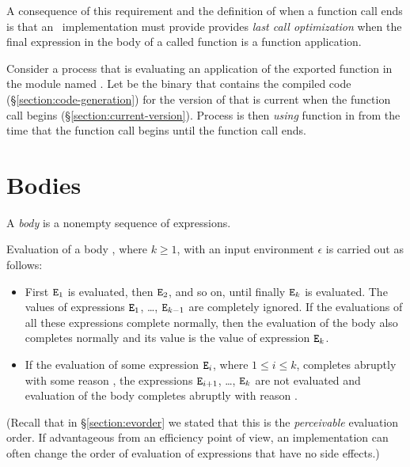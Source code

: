 \label{section:lco}

A consequence of this requirement and the definition of when a
function call ends is that an \Erlang\ implementation \ifStd must
provide \else provides \fi \emph{last call optimization} when the
final expression in the body of a called function is a function
application.

\label{section:function-use}

Consider a process  that is evaluating an application of the
exported function  in the module named .  Let
 be the binary that contains the compiled code
(\S\ref{section:code-generation}) for the version of  that is
current when the function call begins
(\S\ref{section:current-version}).  Process  is then
\emph{using} function  in  from the time that
the function call begins until the function call ends.

\section{Bodies}

\label{section:bodies}

A \emph{body} is a nonempty sequence of expressions.

\SYNTAX

\begin{rules}
       {}

       { \OR
         \TXT{,} }
\end{rules}

\EVALUATION

Evaluation of a body ,
where $k\geq 1$, with an input environment $\epsilon$
is carried out as follows:

\begin{itemize}
\item First ${\tt{\sl E}}_1$ is evaluated, then
${\tt{\sl E}}_2$, and so on, until finally ${\tt{\sl E}}_k$ is evaluated.  The
values of expressions ${\tt{\sl E}}_1$, \ldots, ${\tt{\sl E}}_{k-1}$ are
completely ignored.  If the evaluations of all these expressions
complete normally, then the evaluation of the body also completes
normally and its value is the value of expression ${\tt{\sl E}}_k$.
\item If the evaluation of some expression ${\tt{\sl E}}_i$, where $1\leq
i\leq k$, completes abruptly with some reason , the expressions
${\tt{\sl E}}_{i+1}$, \ldots, ${\tt{\sl E}}_k$ are not evaluated and evaluation of
the body completes abruptly with reason .
\end{itemize}
(Recall that in \S\ref{section:evorder} we stated that this is the
\emph{perceivable} evaluation order.  If advantageous from an
efficiency point of view, an implementation can often change the order
of evaluation of expressions that have no side effects.)


